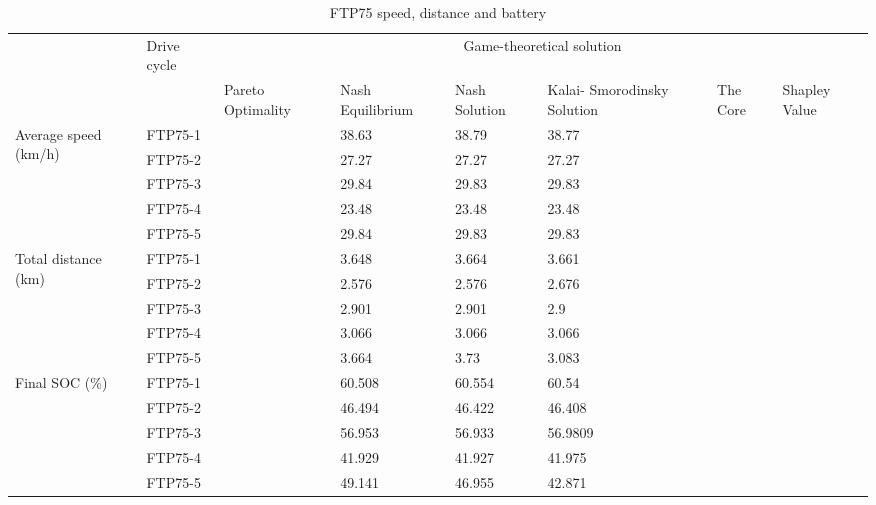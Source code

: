 \begin{table}[h]
\centering
\begin{tabular}{ |p{1.5cm}|p{1.5cm}|p{1.3cm}|p{1.3cm}|p{1.3cm}|p{1.3cm}|p{1.3cm}|p{1.3cm}|} 
 \hline
  \cline{3-8}
   & Drive cycle & \multicolumn{6}{|c|}{Game-theoretical solution} \\
   \cline{3-8}
   & & Pareto Optimality & Nash Equilibrium & Nash Solution & Kalai- Smorodinsky Solution & The Core & Shapley Value\\
 \hline\hline
 \multirow{5}{*}{\parbox{1.5cm}{Average speed (km/h)}}
 & FTP75-1 & & 38.63 & 38.79 & 38.77 & & \\
 & FTP75-2 & & 27.27 & 27.27 & 27.27 & & \\ 
 & FTP75-3 & & 29.84 & 29.83 & 29.83 & & \\ 
 & FTP75-4 & & 23.48 & 23.48 & 23.48 & & \\ 
 & FTP75-5 & & 29.84 & 29.83 & 29.83 & & \\ 
 \hline 
 \multirow{5}{*}{\parbox{1.5cm}{Total distance (km)}}
 & FTP75-1 & & 3.648 & 3.664 & 3.661 & & \\ 
 & FTP75-2 & & 2.576 & 2.576 & 2.676 & & \\ 
 & FTP75-3 & & 2.901 & 2.901 & 2.9 & & \\ 
 & FTP75-4 & & 3.066 & 3.066 & 3.066 & & \\ 
 & FTP75-5 & & 3.664 & 3.73 & 3.083 & & \\ 
 \hline 
 \multirow{5}{*}{\parbox{1.5cm}{Final SOC (\%)}}
 & FTP75-1 & & 60.508 & 60.554 & 60.54 & & \\ 
 & FTP75-2 & & 46.494 & 46.422 & 46.408 & & \\ 
 & FTP75-3 & & 56.953 & 56.933 & 56.9809 & & \\ 
 & FTP75-4 & & 41.929 & 41.927 & 41.975 & & \\ 
 & FTP75-5 & & 49.141 & 46.955 & 42.871 & & \\ 
 \hline

 \hline
\end{tabular}
\caption{FTP75 speed, distance and battery}
\label{tab:fuelEmis}
\end{table}
